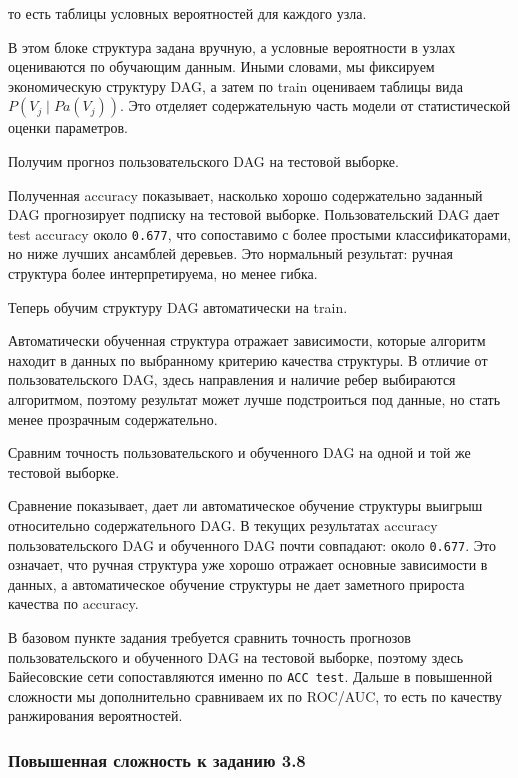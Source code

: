 \documentclass[11pt]{article}
\begin{document}
то есть таблицы условных вероятностей для каждого узла.

    В этом блоке структура задана вручную, а условные вероятности в узлах
оцениваются по обучающим данным. Иными словами, мы фиксируем
экономическую структуру DAG, а затем по train оцениваем таблицы вида
\(P(V_j \mid Pa(V_j))\). Это отделяет содержательную часть модели от
статистической оценки параметров.

    Получим прогноз пользовательского DAG на тестовой выборке.

    Полученная accuracy показывает, насколько хорошо содержательно заданный
DAG прогнозирует подписку на тестовой выборке. Пользовательский DAG дает
test accuracy около \texttt{0.677}, что сопоставимо с более простыми
классификаторами, но ниже лучших ансамблей деревьев. Это нормальный
результат: ручная структура более интерпретируема, но менее гибка.

    Теперь обучим структуру DAG автоматически на train.

    Автоматически обученная структура отражает зависимости, которые алгоритм
находит в данных по выбранному критерию качества структуры. В отличие от
пользовательского DAG, здесь направления и наличие ребер выбираются
алгоритмом, поэтому результат может лучше подстроиться под данные, но
стать менее прозрачным содержательно.

    Сравним точность пользовательского и обученного DAG на одной и той же
тестовой выборке.

    Сравнение показывает, дает ли автоматическое обучение структуры выигрыш
относительно содержательного DAG. В текущих результатах accuracy
пользовательского DAG и обученного DAG почти совпадают: около
\texttt{0.677}. Это означает, что ручная структура уже хорошо отражает
основные зависимости в данных, а автоматическое обучение структуры не
дает заметного прироста качества по accuracy.

В базовом пункте задания требуется сравнить точность прогнозов
пользовательского и обученного DAG на тестовой выборке, поэтому здесь
Байесовские сети сопоставляются именно по \texttt{ACC\ test}. Дальше в
повышенной сложности мы дополнительно сравниваем их по ROC/AUC, то есть
по качеству ранжирования вероятностей.

    \subsubsection{Повышенная сложность к заданию
3.8}\label{ux43fux43eux432ux44bux448ux435ux43dux43dux430ux44f-ux441ux43bux43eux436ux43dux43eux441ux442ux44c-ux43a-ux437ux430ux434ux430ux43dux438ux44e-3.8}
\end{document}

